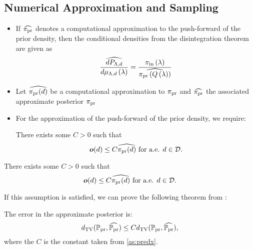\subsection{Numerical Approximation and Sampling}
\begin{frame}[t]
\begin{itemize}
	\item If $\widehat{\operatorname*{\pi_{pr}}}$ denotes a computational approximation to the push-forward of the prior density, then the conditional densities from the disintegration theorem are given as
\[
\frac{\widehat{dP_{{\Lambda}, d}}}{d\mu_{{\Lambda}, d}\left ( \lambda \right )} = \frac{\operatorname*{\pi_{in}}\left ( \lambda \right )}{ \widehat{\operatorname*{\pi_{pr}}\left ( Q\left ( \lambda \right ) \right )} }
\]
	\item Let $\widehat{\operatorname*{\pi_{pr}}(d)}$ be a computational approximation to $\operatorname*{\pi_{pr}}$ and $\widehat{\operatorname*{\pi_{pr}}}$ the associated approximate posterior $\operatorname*{\pi_{pr}}$
	\item For the approximation of the push-forward of the prior density, we require:
\begin{assumption}\label{as:predx}
There exists some $C>0$ such that
\[
\operatorname*{\boldsymbol{o}} (d) \leq C \widehat{\operatorname*{\pi_{pr}}(d)} \text{ for a.e. } d\in \mathcal{D}.
\]
\end{assumption}

\end{itemize}

\end{frame}


\begin{frame}[t]
\begin{assumption}\label{as:predx}
There exists some $C>0$ such that
\[
\operatorname*{\boldsymbol{o}} (d) \leq C \widehat{\operatorname*{\pi_{pr}}(d)} \text{ for a.e. } d\in \mathcal{D}.
\]
\end{assumption}

If this assumption is satisfied, we can prove the following theorem from \cite{BJW18}:

\begin{theorem}
The error in the approximate posterior is:
\begin{equation}\label{eq:pred_bound}
d_{\text{TV}} (\operatorname*{\mathbb{P}_{pr}}, \widehat{\operatorname*{\mathbb{P}_{pr}}}) \leq C d_{\text{TV}} (\operatorname*{\mathbb{P}_{pr}}, \widehat{\operatorname*{\mathbb{P}_{pr}}}),
\end{equation}
where the $C$ is the constant taken from \eqref{as:predx}.
\end{theorem}

\end{frame}


